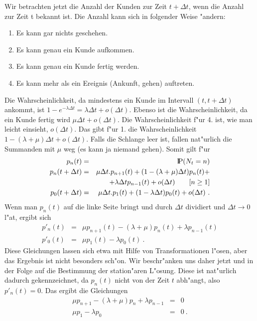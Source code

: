 Wir betrachten jetzt die Anzahl der Kunden zur Zeit $t+ \Delta t$, wenn
die Anzahl zur Zeit t bekannt ist. Die Anzahl kann sich in folgender Weise
"andern:
\begin{enumerate}
\item Es kann gar nichts geschehen.
\item Es kann genau ein Kunde aufkommen.
\item Es kann genau ein Kunde fertig werden.
\item Es kann mehr als ein Ereignis (Ankunft, gehen) auftreten.
\end{enumerate}
Die Wahrscheinlichkeit, da\3 mindestens ein Kunde im Intervall $(t, t+ \Delta t)$
ankommt, ist $1-e^{-\lambda \Delta t} = \lambda \Delta t + o (\Delta t)$.
Ebenso ist die Wahrscheinlichkeit, da\3 ein Kunde fertig wird $\mu \Delta
t + o(\Delta t)$. Die Wahrscheinlichkeit f"ur 4. ist, wie man leicht
einsieht, $o(\Delta t)$. Das gibt f"ur 1. die Wahrscheinlichkeit $1 -
(\lambda + \mu) \Delta t + o(\Delta t)$. Falls die Schlange leer ist,
fallen nat"urlich die Summanden mit $\mu$ weg (es kann ja niemand gehen).
Somit gilt f"ur
\begin{eqnarray*}
p_{n}(t) &=& {\rm I\kern-0.2em P} (N_{t} = n) \\
p_{n}(t+ \Delta t) &=& \mu \Delta t . p_{n+1}(t) + (1 - (\lambda +
\mu) \Delta t) p_{n}(t) + \\
 & &+ \lambda \Delta t p_{n-1}(t) + o(\Delta t)
\qquad [n \geq 1] \\ 
p_{0}(t + \Delta t) &=& \mu \Delta t . p_{1}(t) + (1 - \lambda \Delta t)
p_{0}(t) + o(\Delta t) ~.
\end{eqnarray*}
Wenn man $p_{n}(t)$ auf die linke Seite bringt und durch $\Delta t$
dividiert und $\Delta t \rightarrow 0$ l"a\3t, ergibt sich
\begin{eqnarray*}
p'_{n}(t) &=& \mu p_{n+1}(t)-(\lambda + \mu) p_{n}(t)+ \lambda p_{n-1}(t)
\\
p'_{0}(t) &=& \mu p_{1}(t)- \lambda p_{0}(t) ~.
\end{eqnarray*}
Diese Gleichungen lassen sich etwa mit Hilfe von Transformationen l"osen,
aber das Ergebnis ist nicht besonders sch"on. Wir beschr"anken uns daher
jetzt und in der Folge auf die Bestimmung der station"aren L"osung. Diese
ist nat"urlich dadurch gekennzeichnet, da\3 $p_{n}(t)$ nicht von der Zeit
$t$ abh"angt, also $p'_{n}(t)=0$. Das ergibt die Gleichungen
\begin{eqnarray*}
\mu p_{n+1}-(\lambda +\mu) p_{n} + \lambda p_{n-1} &=& 0 \\
\mu p_{1} - \lambda p_{0} &=& 0 ~.
\end{eqnarray*}  
